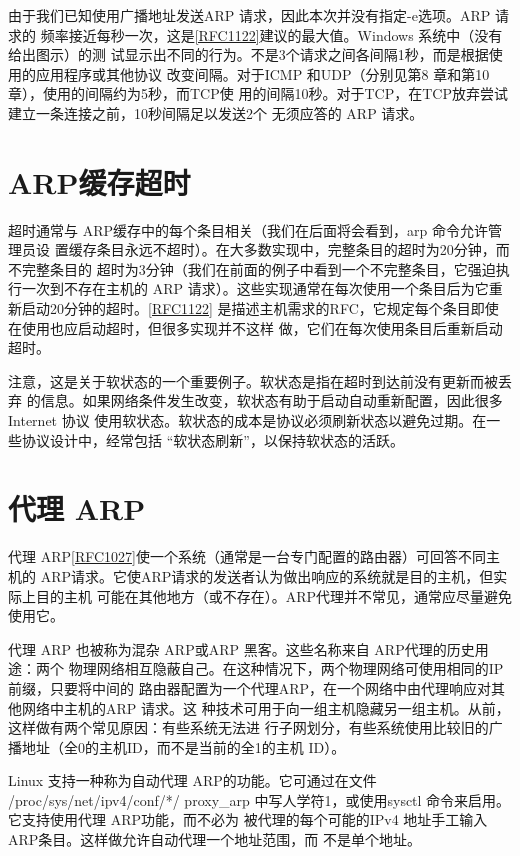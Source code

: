 由于我们已知使用广播地址发送ARP 请求，因此本次并没有指定-e选项。ARP 请求的
频率接近每秒一次，这是\href{https://www.rfc-editor.org/rfc/rfc1122}{[RFC1122]}建议的最大值。Windows 系统中（没有给出图示）的测
试显示出不同的行为。不是3个请求之间各间隔1秒，而是根据使用的应用程序或其他协议
改变间隔。对于ICMP 和UDP（分别见第8 章和第10章），使用的间隔约为5秒，而TCP使
用的间隔10秒。对于TCP，在TCP放弃尝试建立一条连接之前，10秒间隔足以发送2个
无须应答的 ARP 请求。

\section{ARP缓存超时}

超时通常与 ARP缓存中的每个条目相关（我们在后面将会看到，arp 命令允许管理员设
置缓存条目永远不超时）。在大多数实现中，完整条目的超时为20分钟，而不完整条目的
超时为3分钟（我们在前面的例子中看到一个不完整条目，它强迫执行一次到不存在主机的
ARP 请求）。这些实现通常在每次使用一个条目后为它重新启动20分钟的超时。\href{https://www.rfc-editor.org/rfc/rfc1122}{[RFC1122]}
是描述主机需求的RFC，它规定每个条目即使在使用也应启动超时，但很多实现并不这样
做，它们在每次使用条目后重新启动超时。

注意，这是关于软状态的一个重要例子。软状态是指在超时到达前没有更新而被丢弃
的信息。如果网络条件发生改变，软状态有助于启动自动重新配置，因此很多 Internet 协议
使用软状态。软状态的成本是协议必须刷新状态以避免过期。在一些协议设计中，经常包括
“软状态刷新”，以保持软状态的活跃。

\section{代理 ARP}

代理 ARP\href{https://www.rfc-editor.org/rfc/rfc1027}{[RFC1027]}使一个系统（通常是一台专门配置的路由器）可回答不同主机的
ARP请求。它使ARP请求的发送者认为做出响应的系统就是目的主机，但实际上目的主机
可能在其他地方（或不存在）。ARP代理并不常见，通常应尽量避免使用它。

代理 ARP 也被称为混杂 ARP或ARP 黑客。这些名称来自 ARP代理的历史用途：两个
物理网络相互隐蔽自己。在这种情况下，两个物理网络可使用相同的IP前缀，只要将中间的
路由器配置为一个代理ARP，在一个网络中由代理响应对其他网络中主机的ARP 请求。这
种技术可用于向一组主机隐藏另一组主机。从前，这样做有两个常见原因：有些系统无法进
行子网划分，有些系统使用比较旧的广播地址（全0的主机ID，而不是当前的全1的主机
ID）。

Linux 支持一种称为自动代理 ARP的功能。它可通过在文件 /proc/sys/net/ipv4/conf/*/
proxy\_arp 中写人学符1，或使用sysctl 命令来启用。它支持使用代理 ARP功能，而不必为
被代理的每个可能的IPv4 地址手工输入 ARP条目。这样做允许自动代理一个地址范围，而
不是单个地址。

